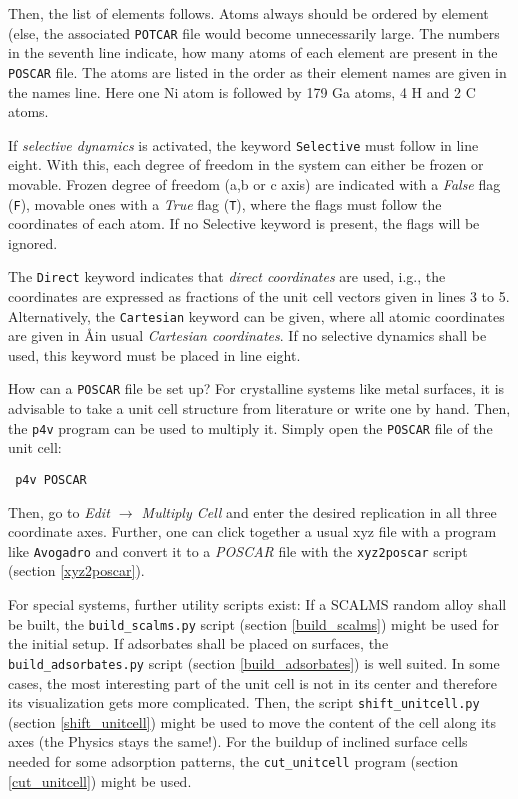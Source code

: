 \documentclass[a4paper,11pt]{article}
\begin{document}
Then, the list of elements follows. Atoms always should be ordered by element (else,
the associated \texttt{POTCAR} file would become unnecessarily large.
The numbers in the seventh line indicate, how many atoms of each element are present 
in the \texttt{POSCAR} file. The atoms are listed in the order as their element names are given in the 
names line.  Here one Ni atom is followed by 179 Ga atoms, 4 H and 2 C atoms. 

If \textit{selective dynamics} is activated, the keyword \texttt{Selective} must follow 
in line eight. With this, each degree of freedom in the system can either be frozen or 
movable. Frozen degree of freedom (a,b or c axis) are indicated with a \textit{False} flag (\texttt{F}), 
movable ones with a \textit{True} flag (\texttt{T}), where the flags must follow the coordinates of 
each atom. If no Selective keyword is present, the flags will be ignored.

The \texttt{Direct} keyword indicates that \textit{direct coordinates} are used, i.g., the coordinates 
are expressed as fractions of the unit cell vectors given in lines 3 to 5.
Alternatively, the \texttt{Cartesian} keyword can be given, where all atomic coordinates are 
given in \AA in usual \textit{Cartesian coordinates}.
If no selective dynamics shall be used, this keyword must be placed in line eight.

How can a \texttt{POSCAR} file be set up? 
For crystalline systems like metal surfaces, it is advisable to take a unit cell structure 
from literature or write one by hand. Then, the \texttt{p4v} program can be used to multiply it.
Simply open the \texttt{POSCAR} file of the unit cell:

\begin{verbatim}
 p4v POSCAR
\end{verbatim}

Then, go to \textit{Edit $\rightarrow$ Multiply Cell} and enter the desired replication in all three
coordinate axes. 
Further, one can click together a usual xyz file with a program like \texttt{Avogadro} and convert it 
to a \textit{POSCAR} file with the \texttt{xyz2poscar} script (section \ref{xyz2poscar}).

For special systems, further utility scripts exist: If a SCALMS random alloy shall be built, the 
\texttt{build\_scalms.py} script (section \ref{build_scalms}) might be used for the initial setup.
If adsorbates shall be placed on surfaces, the \texttt{build\_adsorbates.py} script (section \ref{build_adsorbates})
is well suited.
In some cases, the most interesting part of the unit cell is not in its center and therefore
its visualization gets more complicated. Then, the script \texttt{shift\_unitcell.py} 
(section \ref{shift_unitcell}) might be used 
to move the content of the cell along its axes (the Physics stays the same!).
For the buildup of inclined surface cells needed for some adsorption patterns, the \texttt{cut\_unitcell}
program (section \ref{cut_unitcell}) might be used.
\end{document}
